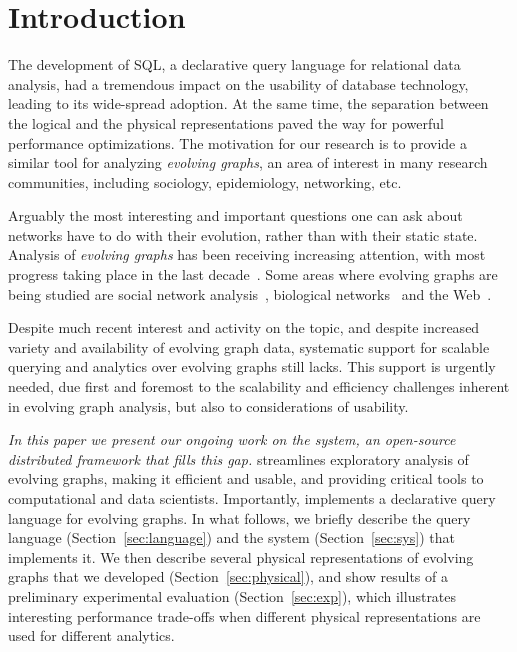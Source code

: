 \section{Introduction}
\label{sec:intro}

The development of SQL, a declarative query language for relational
data analysis, had a tremendous impact on the usability of database
technology, leading to its wide-spread adoption.  At the same time,
the separation between the logical and the physical representations
paved the way for powerful performance optimizations.  The motivation
for our research is to provide a similar tool for analyzing {\em
  evolving graphs}, an area of interest in many research communities,
including sociology, epidemiology, networking, etc.

Arguably the most interesting and important questions one can ask
about networks have to do with their evolution, rather than with their
static state.  Analysis of {\em evolving graphs} has been receiving
increasing attention, with most progress taking place in the last
decade~\cite{DBLP:journals/csur/AggarwalS14,Chan2008,Kan2009,DBLP:journals/tos/MiaoHLWYZPCC15,Ren2011,Semertzidis2015}.
Some areas where evolving graphs are being studied are social network
analysis~\cite{DBLP:conf/icwsm/GoetzLMF09,DBLP:journals/tweb/LeskovecAH07,DBLP:conf/kdd/LeskovecBKT08,DBLP:conf/icml/SarkarCJ12},
biological networks~\cite{DBLP:journals/tkdd/AsurPU09,DBLP:journals/tcsb/BeyerTLSF10,Stuart2003} and the Web~\cite{DBLP:journals/kais/ChanBL08,DBLP:journals/jisa/PapadimitriouDG10}.

Despite much recent interest and activity on the topic, and despite
increased variety and availability of evolving graph data, systematic
support for scalable querying and analytics over evolving graphs still
lacks. This support is urgently needed, due first and foremost to the
scalability and efficiency challenges inherent in evolving graph
analysis, but also to considerations of usability. 

 {\em In this paper we present our ongoing work on the \ql system, an
   open-source distributed framework that fills this gap.} \ql
 streamlines exploratory analysis of evolving graphs, making it
 efficient and usable, and providing critical tools to computational
 and data scientists.  Importantly, \ql implements a declarative query
 language for evolving graphs.  In what follows, we briefly describe
 the query language (Section~\ref{sec:language}) and the \ql system
 (Section~\ref{sec:sys}) that implements it.  We then describe several
 physical representations of evolving graphs that we developed
 (Section~\ref{sec:physical}), and show results of a preliminary
 experimental evaluation (Section~\ref{sec:exp}), which
 illustrates interesting performance trade-offs when different
 physical representations are used for different analytics.


